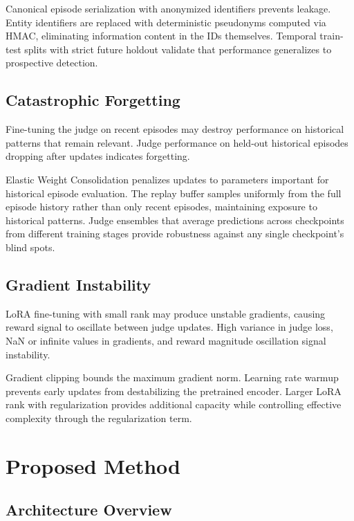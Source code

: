 \documentclass[11pt,a4paper]{article}
\begin{document}
Canonical episode serialization with anonymized identifiers prevents leakage. Entity identifiers are replaced with deterministic pseudonyms computed via HMAC, eliminating information content in the IDs themselves. Temporal train-test splits with strict future holdout validate that performance generalizes to prospective detection.

\subsection{Catastrophic Forgetting}

Fine-tuning the judge on recent episodes may destroy performance on historical patterns that remain relevant. Judge performance on held-out historical episodes dropping after updates indicates forgetting.

Elastic Weight Consolidation penalizes updates to parameters important for historical episode evaluation. The replay buffer samples uniformly from the full episode history rather than only recent episodes, maintaining exposure to historical patterns. Judge ensembles that average predictions across checkpoints from different training stages provide robustness against any single checkpoint's blind spots.

\subsection{Gradient Instability}

LoRA fine-tuning with small rank may produce unstable gradients, causing reward signal to oscillate between judge updates. High variance in judge loss, NaN or infinite values in gradients, and reward magnitude oscillation signal instability.

Gradient clipping bounds the maximum gradient norm. Learning rate warmup prevents early updates from destabilizing the pretrained encoder. Larger LoRA rank with regularization provides additional capacity while controlling effective complexity through the regularization term.

\section{Proposed Method}

\subsection{Architecture Overview}
\end{document}
